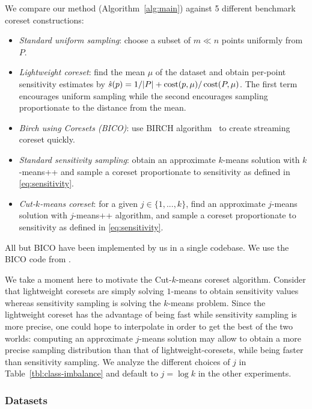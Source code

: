 We compare our method (Algorithm~\ref{alg:main}) against 5 different benchmark coreset constructions:
\begin{itemize}
        \item \emph{Standard uniform sampling}: choose a subset of $m \ll n$ points uniformly from $P$.
        \item \emph{Lightweight coreset}: find the mean $\mu$ of the dataset and obtain per-point sensitivity estimates by $\hat{s}(p) = 1/|P| + \operatorname{cost}(p, \mu) / \operatorname{cost}(P, \mu)$.
            The first term encourages uniform sampling while the second encourages sampling proportionate to the distance from the mean.
        \item \emph{Birch using Coresets (BICO)}: use BIRCH algorithm~\cite{birch} to create streaming coreset quickly. 
        \item \emph{Standard sensitivity sampling}: obtain an approximate $k$-means solution with $k$-means++ and sample a coreset proportionate to sensitivity as defined in \cref{eq:sensitivity}.
        \item \emph{Cut-$k$-means coreset}: for a given $j \in \{1,..., k\}$, find an approximate $j$-means solution with $j$-means++ algorithm, and sample
            a coreset proportionate to sensitivity as defined in \cref{eq:sensitivity}.\end{itemize}
All but BICO have been implemented by us in a single codebase. We use the BICO code from \cite{bico}.

We take a moment here to motivate the Cut-$k$-means coreset algorithm.  Consider that lightweight coresets are simply solving $1$-means to obtain sensitivity
values whereas sensitivity sampling is solving the $k$-means problem. Since the lightweight coreset has the advantage of being fast while sensitivity sampling
is more precise, one could hope to interpolate in order to get the best of the two worlds: computing an approximate $j$-means solution may allow to obtain
a more precise sampling distribution than that of lightweight-coresets, while being faster than sensitivity sampling. We analyze the different choices of $j$ in
Table~\ref{tbl:class-imbalance} and default to $j = \log k$ in the other experiments.

\subsubsection{Datasets}



